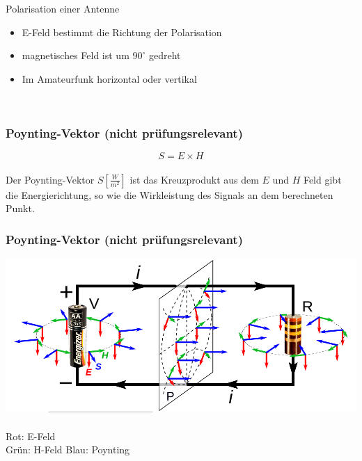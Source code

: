 \begin{frame}
\begin{center}
\begin{minipage}{0.45\textwidth}
      {\tiny Polarisation einer Antenne}
      \begin{itemize}
        \item E-Feld bestimmt die Richtung der Polarisation
        \item magnetisches Feld ist um $90^\circ$ gedreht
        \item Im Amateurfunk horizontal oder vertikal
      \end{itemize}
    \end{minipage}\\[1.5em]
  \end{center}
\end{frame}

\begin{frame}
  \frametitle{Poynting-Vektor (nicht prüfungsrelevant)}
  \begin{center}
    \huge $$S = E \times H$$ \\[1em]
    \large Der Poynting-Vektor $S[\frac{W}{m^2}]$ ist das Kreuzprodukt aus dem $E$ und $H$ Feld gibt die Energierichtung, so wie die Wirkleistung des Signals an dem berechneten Punkt.
  \end{center}
\end{frame}

\begin{frame}
  \frametitle{Poynting-Vektor (nicht prüfungsrelevant)}
  \begin{center}
    \includegraphics[width=1\textwidth]{a08/Poynting_vectors_of_DC_circuit.png}\\
    \tiny \hyperlink{refs}{\cite{wm}} \\[1em] \large
    Rot: E-Feld \\
    Grün: H-Feld
    Blau: Poynting
  \end{center}
\end{frame}

